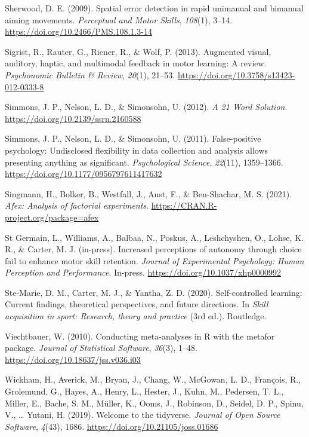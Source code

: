 \documentclass[
  doc, donotrepeattitle,floatsintext]{apa7}
\newlength{\cslhangindent}
\newlength{\cslentryspacingunit} %
\newenvironment{CSLReferences}[2] %
 {%
  \setlength{\parindent}{0pt}
  \ifodd #1
  \let\oldpar\par
  \def\par{\hangindent=\cslhangindent\oldpar}
  \fi
  \setlength{\parskip}{#2\cslentryspacingunit}
 }%
 {}
\begin{document}
\begin{CSLReferences}{1}{0}
\leavevmode{}%
Sherwood, D. E. (2009). Spatial error detection in rapid unimanual and bimanual aiming movements. \emph{Perceptual and Motor Skills}, \emph{108}(1), 3--14. \url{https://doi.org/10.2466/PMS.108.1.3-14}

\leavevmode{}%
Sigrist, R., Rauter, G., Riener, R., \& Wolf, P. (2013). Augmented visual, auditory, haptic, and multimodal feedback in motor learning: A review. \emph{Psychonomic Bulletin \& Review}, \emph{20}(1), 21--53. \url{https://doi.org/10.3758/s13423-012-0333-8}

\leavevmode{}%
Simmons, J. P., Nelson, L. D., \& Simonsohn, U. (2012). \emph{A 21 Word Solution}. \url{https://doi.org/10.2139/ssrn.2160588}

\leavevmode{}%
Simmons, J. P., Nelson, L. D., \& Simonsohn, U. (2011). False-positive psychology: Undisclosed flexibility in data collection and analysis allows presenting anything as significant. \emph{Psychological Science}, \emph{22}(11), 1359--1366. \url{https://doi.org/10.1177/0956797611417632}

\leavevmode{}%
Singmann, H., Bolker, B., Westfall, J., Aust, F., \& Ben-Shachar, M. S. (2021). \emph{Afex: Analysis of factorial experiments}. \url{https://CRAN.R-project.org/package=afex}

\leavevmode{}%
St Germain, L., Williams, A., Balbaa, N., Poskus, A., Leshchyshen, O., Lohse, K. R., \& Carter, M. J. (in-press). Increased perceptions of autonomy through choice fail to enhance motor skill retention. \emph{Journal of Experimental Psychology: Human Perception and Performance}. In-press. \url{https://doi.org/10.1037/xhp0000992}

\leavevmode{}%
Ste-Marie, D. M., Carter, M. J., \& Yantha, Z. D. (2020). Self-controlled learning: {Current} findings, theoretical perspectives, and future directions. In \emph{Skill acquisition in sport: Research, theory and practice} (3rd ed.). {Routledge}.

\leavevmode{}%
Viechtbauer, W. (2010). Conducting meta-analyses in {R} with the {metafor} package. \emph{Journal of Statistical Software}, \emph{36}(3), 1--48. \url{https://doi.org/10.18637/jss.v036.i03}

\leavevmode{}%
Wickham, H., Averick, M., Bryan, J., Chang, W., McGowan, L. D., François, R., Grolemund, G., Hayes, A., Henry, L., Hester, J., Kuhn, M., Pedersen, T. L., Miller, E., Bache, S. M., Müller, K., Ooms, J., Robinson, D., Seidel, D. P., Spinu, V., \ldots{} Yutani, H. (2019). Welcome to the {tidyverse}. \emph{Journal of Open Source Software}, \emph{4}(43), 1686. \url{https://doi.org/10.21105/joss.01686}


\end{CSLReferences}
\end{document}

